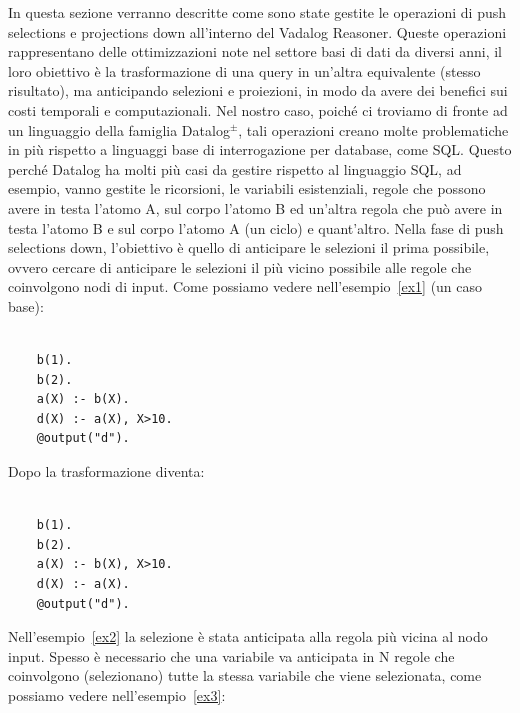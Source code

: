 In questa sezione verranno descritte come sono state gestite le operazioni di push selections e projections down all'interno del Vadalog Reasoner. \newline
Queste operazioni rappresentano delle ottimizzazioni note nel settore basi di dati da diversi anni, il loro obiettivo è la trasformazione di una query in un'altra equivalente (stesso risultato), ma anticipando selezioni e proiezioni, in modo da avere dei benefici sui costi temporali e computazionali. \newline
Nel nostro caso, poiché ci troviamo di fronte ad un linguaggio della famiglia Datalog$^\pm$, tali operazioni creano molte problematiche in più rispetto a linguaggi base di interrogazione per database, come SQL. \newline
Questo perché Datalog ha molti più casi da gestire rispetto al linguaggio SQL, ad esempio, vanno gestite le ricorsioni, le variabili esistenziali, regole che possono avere in testa l'atomo A, sul corpo l'atomo B ed un'altra regola che può avere in testa l'atomo B e sul corpo l'atomo A (un ciclo) e quant'altro. \newline \newline
Nella fase di push selections down, l'obiettivo è quello di anticipare le selezioni il prima possibile, ovvero cercare di anticipare le selezioni il più vicino possibile alle regole che coinvolgono nodi di input. Come possiamo vedere nell'esempio~\ref{ex1} (un caso base): 
\begin{example}\label{ex1}
\normalfont
{}
\begin{lstlisting}
	
	b(1). 
	b(2). 
	a(X) :- b(X). 
	d(X) :- a(X), X>10. 
	@output("d").
\end{lstlisting}
\end{example}
Dopo la trasformazione diventa: 
\begin{example}\label{ex2}
	\normalfont
	\begin{lstlisting}
	
	b(1). 
	b(2). 
	a(X) :- b(X), X>10. 
	d(X) :- a(X). 
	@output("d").
	\end{lstlisting}
\end{example}
Nell'esempio~\ref{ex2} la selezione è stata anticipata alla regola più vicina al nodo input. \newline
Spesso è necessario che una variabile va anticipata in N regole che coinvolgono (selezionano) tutte la stessa variabile che viene selezionata, come possiamo vedere nell'esempio~\ref{ex3}: 
